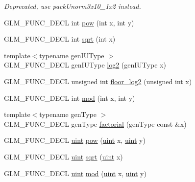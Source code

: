 \begin{DoxyCompactItemize}
\begin{DoxyCompactList}\small\item\em Deprecated, use pack\+Unorm3x10\+\_\+1x2 instead. \end{DoxyCompactList}\item 
G\+L\+M\+\_\+\+F\+U\+N\+C\+\_\+\+D\+E\+CL int \hyperlink{group__gtx__integer_ga9642514a44a67afa70966d756f040ca9}{pow} (int x, int y)
\item 
G\+L\+M\+\_\+\+F\+U\+N\+C\+\_\+\+D\+E\+CL int \hyperlink{group__gtx__integer_ga78e2e68330e91d350fcfc2f4831cad12}{sqrt} (int x)
\item 
{\footnotesize template$<$typename gen\+I\+U\+Type $>$ }\\G\+L\+M\+\_\+\+F\+U\+N\+C\+\_\+\+D\+E\+CL gen\+I\+U\+Type \hyperlink{group__gtx__integer_ga9bd682e74bfacb005c735305207ec417}{log2} (gen\+I\+U\+Type x)
\item 
G\+L\+M\+\_\+\+F\+U\+N\+C\+\_\+\+D\+E\+CL unsigned int \hyperlink{group__gtx__integer_ga7011b4e1c1e1ed492149b028feacc00e}{floor\+\_\+log2} (unsigned int x)
\item 
G\+L\+M\+\_\+\+F\+U\+N\+C\+\_\+\+D\+E\+CL int \hyperlink{group__gtx__integer_gab9d22df91aac4d9eb925a4910f556f1b}{mod} (int x, int y)
\item 
{\footnotesize template$<$typename gen\+Type $>$ }\\G\+L\+M\+\_\+\+F\+U\+N\+C\+\_\+\+D\+E\+CL gen\+Type \hyperlink{group__gtx__integer_ga8cbd3120905f398ec321b5d1836e08fb}{factorial} (gen\+Type const \&x)
\item 
G\+L\+M\+\_\+\+F\+U\+N\+C\+\_\+\+D\+E\+CL \hyperlink{group__core__precision_ga4fd29415871152bfb5abd588334147c8}{uint} \hyperlink{group__gtx__integer_gaa8229e850c3cc4ad83492fe390ada044}{pow} (\hyperlink{group__core__precision_ga4fd29415871152bfb5abd588334147c8}{uint} x, \hyperlink{group__core__precision_ga4fd29415871152bfb5abd588334147c8}{uint} y)
\item 
G\+L\+M\+\_\+\+F\+U\+N\+C\+\_\+\+D\+E\+CL \hyperlink{group__core__precision_ga4fd29415871152bfb5abd588334147c8}{uint} \hyperlink{group__gtx__integer_ga457e9efca8339bf918d319e9c55f7c8f}{sqrt} (\hyperlink{group__core__precision_ga4fd29415871152bfb5abd588334147c8}{uint} x)
\item 
G\+L\+M\+\_\+\+F\+U\+N\+C\+\_\+\+D\+E\+CL \hyperlink{group__core__precision_ga4fd29415871152bfb5abd588334147c8}{uint} \hyperlink{group__gtx__integer_gab8f9ec0ca93ca90669434224818f0750}{mod} (\hyperlink{group__core__precision_ga4fd29415871152bfb5abd588334147c8}{uint} x, \hyperlink{group__core__precision_ga4fd29415871152bfb5abd588334147c8}{uint} y)

\end{DoxyCompactItemize}
